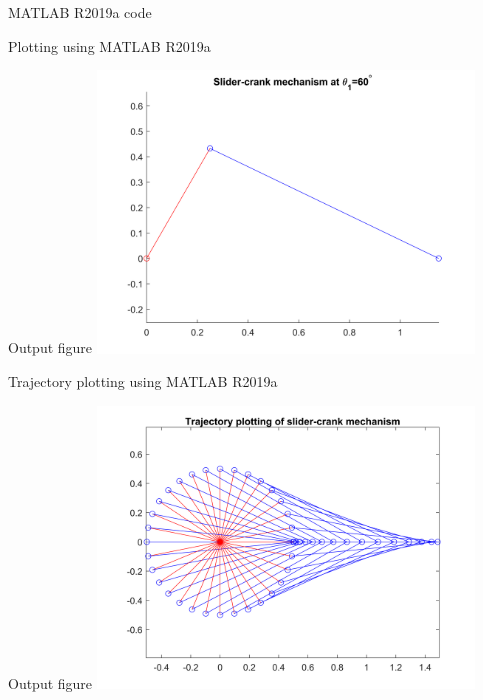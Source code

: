 \begin{frame}{MATLAB R2019a code}
	
\end{frame}
\begin{frame}{Plotting using MATLAB R2019a}
	
\end{frame}
\begin{frame}{Output figure}
\centering
\includegraphics[width=100mm]{images/RRRT-plot.png}
\end{frame}
\begin{frame}{Trajectory plotting using MATLAB R2019a}

\end{frame}
\begin{frame}{Output figure}
\centering
\includegraphics[width=100mm]{images/RRRT-trajectory.png}
\end{frame}